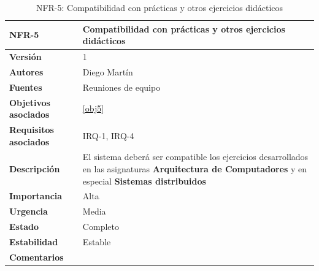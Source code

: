 \begin{table}[H]
\centering
\begin{tabular}{|p{3.5cm}|p{10cm}|}
\hline
\textbf{NFR-5} &Compatibilidad con prácticas y otros ejercicios didácticos\\
\hline
\textbf{Versión} &1\\
\hline
\textbf{Autores} & Diego Martín\\
\hline
\textbf{Fuentes} &Reuniones de equipo\\
\hline
\textbf{Objetivos asociados} & \ref{obj5}\\
\hline
\textbf{Requisitos asociados} & IRQ-1, IRQ-4\\
\hline
\textbf{Descripción} &El sistema deberá ser compatible los ejercicios desarrollados en las asignaturas \textbf{Arquitectura de Computadores} y en especial \textbf{Sistemas distribuidos}\\
\hline
\textbf{Importancia} &Alta\\
\hline
\textbf{Urgencia} &Media\\
\hline
\textbf{Estado} &Completo\\
\hline
\textbf{Estabilidad} &Estable\\
\hline
\textbf{Comentarios} &\\
\hline
\end{tabular}
\caption{NFR-5: Compatibilidad con prácticas y otros ejercicios didácticos}
\end{table}




